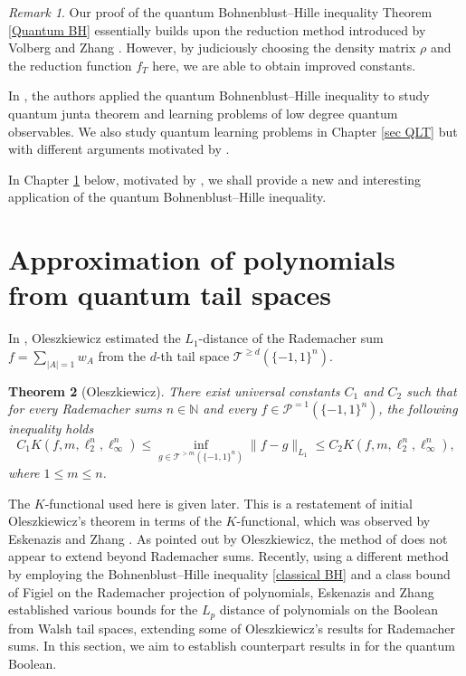 \documentclass{amsbook}
\newtheorem{theorem}{Theorem}[chapter]
\theoremstyle{definition}
\theoremstyle{remark}
\newtheorem{remark}[theorem]{Remark}
\numberwithin{section}{chapter}
\numberwithin{equation}{chapter}
\newcommand{\1}{\mathbf{1}}
\begin{document}
\begin{remark}\label{rem BH}
Our proof of the quantum Bohnenblust--Hille inequality Theorem \ref{Quantum BH} essentially builds upon the reduction method introduced by Volberg and Zhang \cite{VZ2024}. However,  by judiciously choosing   the density matrix $\rho$ and the reduction function $f_T$ here, we are able to obtain improved constants. 
\end{remark}

In \cite{VZ2024}, the authors applied the quantum  Bohnenblust--Hille inequality to study quantum junta theorem and learning problems of low degree quantum observables. We also study quantum learning problems in Chapter \ref{sec QLT} but with different arguments motivated by \cite{EIS2023}. 

In Chapter \ref{sec distance Tail} below, motivated by \cite{EZ2024}, we shall provide a new and interesting application of the quantum  Bohnenblust--Hille inequality. 

\section{Approximation of polynomials from quantum tail spaces}\label{sec distance Tail}
In \cite{Ol2017}, Oleszkiewicz estimated the $L_1$-distance of the Rademacher sum $f=\sum_{|A|=1}w_A$ from the $d$-th tail space $\mathcal{T}^{\geq d}(\{-1,1\}^n)$. 
\begin{theorem}[Oleszkiewicz]\label{Oleszkiewicz inequality}
There exist universal constants $C_{1}$ and $C_{2}$ such that for every  Rademacher sums $n\in \mathbb{N}$ and every $f\in \mathcal{P}^{=1}(\{-1,1\}^{n})$, the following inequality holds
\[
C_{1}K(f,m,\ell^{n}_{2},\ell^{n}_{\infty})\leq \inf_{g\in \mathcal{T}^{>m}(\{-1,1\}^{n})}\|f-g\|_{L_{1}}\leq C_{2}K(f,m,\ell^{n}_{2},\ell^{n}_{\infty}),
\]
where $1\leq m\leq n$.
\end{theorem}
The $K$-functional used here is given later. This is a restatement of initial Oleszkiewicz's theorem in terms of the $K$-functional, which was observed by Eskenazis  and Zhang \cite{EZ2024}.   As  pointed out by Oleszkiewicz, the method of \cite{Ol2017} does not appear to extend beyond Rademacher sums. Recently,  using a different method by employing the Bohnenblust--Hille inequality \eqref{classical BH}  and a class bound of
Figiel on the Rademacher projection of polynomials, Eskenazis  and Zhang \cite{EZ2024} established various bounds for the $L_p$ distance of polynomials on the Boolean from Walsh tail spaces, extending some of Oleszkiewicz's results for Rademacher sums. In this section, we aim to establish counterpart results in \cite{EZ2024} for the quantum Boolean.
\end{document}

